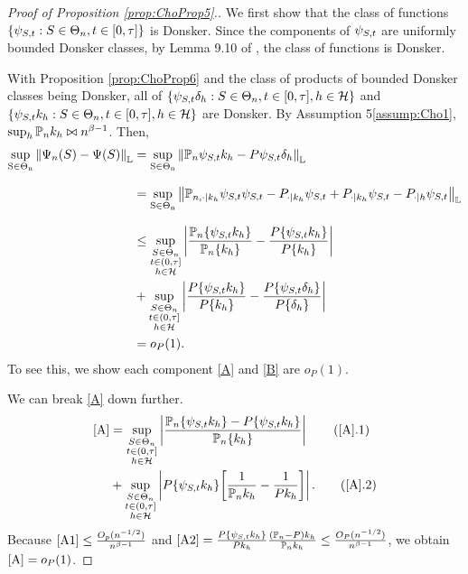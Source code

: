 \begin{proof}[Proof of Proposition \ref{prop:ChoProp5}.] 

We first show that the class of functions $\{ \psi_{S,t} : S \in \Theta_n, t \in [0, \tau]\}$ is Donsker. Since the components of $\psi_{S,t}$ are uniformly bounded Donsker classes, by Lemma 9.10 of \cite{kosorok_introduction_2008}, the class of functions is Donsker. 

With Proposition \ref{prop:ChoProp6} and the class of products of bounded Donsker classes being Donsker, all of $\{ \psi_{S,t} \delta_h : S \in \Theta_n, t \in [0, \tau], h \in \mathcal{H} \}$ and $\{ \psi_{S,t} k_h : S \in \Theta_n, t \in [0, \tau], h \in \mathcal{H} \}$ are Donsker. By Assumption \ifnum{} 5\else \ref{assump:Cho1}\fi, $\sup_{h} \mathbb{P}_n k_h \bowtie n^{\beta-1}$. 
Then,
\begin{align}
\supStheta \norm{\esteqdiff}_\mathbb{L} &= \supStheta \norm{
\Pn\estfunclabel\kernel - \PopP\estfunclabel\unnormdirac
}_\mathbb{L} \notag \eqnspace
&= \supStheta \norm{
\Pndot \estfunclabel
-\PopP_{\cdot\mid\kernel} \estfunclabel
+\PopP_{\cdot\mid\kernel} \estfunclabel
- \Pd\estfunclabel
}_\mathbb{L} \notag \eqnspace
& \leq \bigsup \left| 
\esteqnlong - \frac{\PopP\{\estfunclabel\kernel\}}{\PopP\{\kernel\}}
\right| \label{A} \\
& + \bigsup \left| 
\frac{\PopP\{\estfunclabel\kernel\}}{\PopP\{\kernel\}} - \esteqlong
\right| \label{B} \\
& = o_P(1) \notag.
\end{align}
To see this, we show each component \cref{A} and \cref{B} are $o_P(1)$.

We can break \cref{A} down further.
\begin{align}
\cref{A} &= \bigsup \left| \frac{\Pn\{\estfunclabel\kernel\} - \PopP\{\estfunclabel\kernel\}}{\Pn\{\kernel\}} \right| \label{A1} \tag{\ref{A}.1} \\
&+ \bigsup \left| \PopP\{\estfunclabel\kernel\} \bigg[ \frac{1}{\Pn\kernel} - \frac{1}{\PopP\kernel}\bigg] \right|. \label{A2}  \tag{\ref{A}.2}
\end{align}
Because $\cref{A1} \leq \frac{O_p(n^{-1/2})}{n^{\beta-1}}$ and $\cref{A2} = \frac{\PopP\{\estfunclabel\kernel\}}{\PopP\kernel} \frac{\PnP\kernel}{\Pn\kernel} \leq \frac{O_P(n^{-1/2})}{n^{\beta-1}}$, we obtain $\ref{A} = o_P(1)$.


\end{proof}
